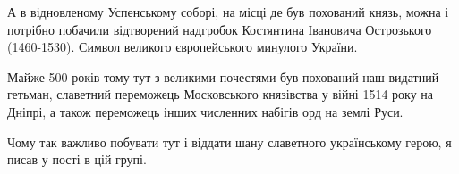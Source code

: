 А в відновленому Успенському соборі, на місці де був похований князь, можна і
потрібно побачили відтворений надгробок Костянтина Івановича Острозького
(1460-1530). Символ великого європейського минулого України.

Майже 500 років тому тут з великими почестями був похований наш видатний
гетьман, славетний переможець Московського князівства у війні 1514 року на
Дніпрі, а також переможець інших численних набігів орд на землі Руси.

Чому так важливо побувати тут і віддати шану славетного українському герою, я
писав у пості в цій групі. 


